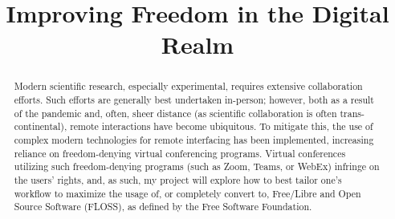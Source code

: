 \documentclass[conference]{IEEEtran}
\begin{document}
\title{Improving Freedom in the Digital Realm}

\author{
}

\maketitle

\begin{abstract}
  Modern scientific research, especially experimental, requires extensive collaboration efforts. Such efforts are generally best undertaken in-person; however, both as a result of the pandemic and, often, sheer distance (as scientific collaboration is often trans-continental), remote interactions have become ubiquitous. To mitigate this, the use of complex modern technologies for remote interfacing has been implemented, increasing reliance on freedom-denying virtual conferencing programs. Virtual conferences utilizing such freedom-denying programs (such as Zoom, Teams, or WebEx) infringe on the users' rights, and, as such, my project will explore how to best tailor one's workflow to maximize the usage of, or completely convert to, Free/Libre and Open Source Software (FLOSS), as defined by the Free Software Foundation.
\end{abstract}
\end{document}
